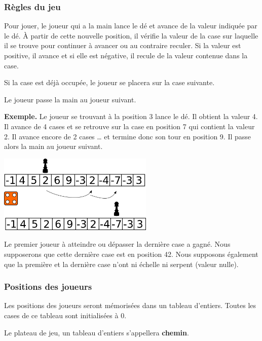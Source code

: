 		\subsubsection*{Règles du jeu}
		
			Pour jouer, le joueur qui a la main lance le dé et avance de la
			valeur indiquée par le dé. À partir de cette nouvelle position, il
			vérifie la valeur de la case sur laquelle il se trouve pour
			continuer à avancer ou au contraire reculer. Si la valeur est
			positive, il avance et si elle est négative, il recule de la valeur
			contenue dans la case.
		
			Si la case est déjà occupée, le joueur se placera sur la case
			suivante. 
		
			Le joueur passe la main au joueur suivant. 
			
			\textbf{Exemple.} Le joueur se trouvant à la position 3 lance le dé.
			Il obtient la valeur 4. Il avance de 4 cases et se retrouve sur la
			case en position 7 qui contient la valeur 2. Il avance encore de
			2 cases … et termine donc son tour en position 9. Il passe alors la
			main au joueur suivant.
		
			\begin{center}
				\includegraphics[width=280px]{images/snake-1}
			\end{center}
			
			Le premier joueur à atteindre ou dépasser la dernière case a gagné.
			Nous supposerons que cette dernière case est en position 42. Nous
			supposons également que la première et la dernière case n’ont ni
			échelle ni serpent (valeur nulle).
	
		\subsubsection*{Positions des joueurs}
		
			Les positions des joueurs seront mémorisées dans un tableau
			d’entiers.  Toutes les cases de ce tableau sont initialisées à 0. 
		
			Le plateau de jeu, un tableau d’entiers s’appellera \textbf{chemin}. 
		

